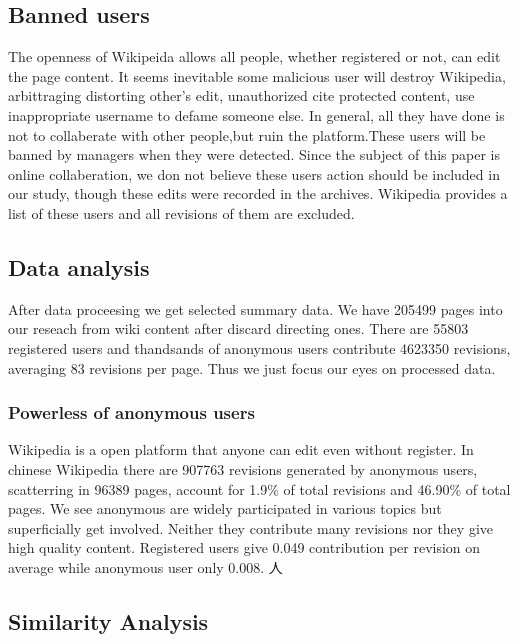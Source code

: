 \documentclass{elsarticle}
\begin{document}
\subsection{Banned users}
\label{sec:banned-users}
The openness of Wikipeida allows all people, whether registered or
not, can edit the page content. It seems inevitable some malicious
user will destroy Wikipedia, arbittraging distorting other's edit,
unauthorized cite protected content, use inappropriate username to
defame someone else. In general, all they have done is not to
collaberate with other people,but ruin the platform.These users will
be banned by managers when they were detected. Since the subject of
this paper is online collaberation, we don not believe these users
action should be included in our study, though these edits were
recorded in the archives. Wikipedia provides a list of these users\cite{badnames}\cite{bannedwikipedians} and
all revisions of them are excluded. 

\subsection{Data analysis}
\label{sec:data-analysis}

After data proceesing we get selected summary data. We have 205499
pages into our reseach from wiki content after discard directing
ones. There are 55803 registered users and thandsands of anonymous
users contribute 4623350 revisions, averaging  83 revisions per
page. Thus we just focus our eyes on processed data.

\subsubsection{Powerless of anonymous users}
\label{sec:powerl-anonym-users}
Wikipedia is  a open platform that anyone can edit even without
register. In chinese Wikipedia there are 907763  revisions generated
by anonymous users, scatterring in 96389 pages, account for 1.9\% of
total revisions and 46.90\% of total pages. We see anonymous are
widely participated in various topics but  superficially get
involved. Neither they contribute many revisions nor they give high
quality content. Registered users  give 0.049 contribution per
revision on average while anonymous user only 0.008. 人 

\subsection{Similarity Analysis}
\label{sec:similarity-analysis}
\end{document}
